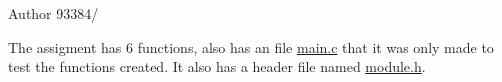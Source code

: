 \begin{DoxyAuthor}{Author}
93384/
\end{DoxyAuthor}
The assigment has 6 functions, also has an file \mbox{\hyperlink{main_8c}{main.\+c}} that it was only made to test the functions created. It also has a header file named \mbox{\hyperlink{module_8h}{module.\+h}}. 